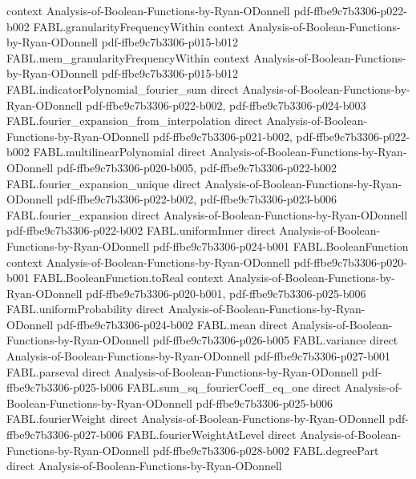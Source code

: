 \begin{theorem}
  {context}
  {Analysis-of-Boolean-Functions-by-Ryan-ODonnell}
  {pdf-ffbe9c7b3306-p022-b002}
\proofstep
  {FABL.granularityFrequencyWithin}
  {context}
  {Analysis-of-Boolean-Functions-by-Ryan-ODonnell}
  {pdf-ffbe9c7b3306-p015-b012}
\proofstep
  {FABL.mem_granularityFrequencyWithin}
  {context}
  {Analysis-of-Boolean-Functions-by-Ryan-ODonnell}
  {pdf-ffbe9c7b3306-p015-b012}
\proofstep
  {FABL.indicatorPolynomial_fourier_sum}
  {direct}
  {Analysis-of-Boolean-Functions-by-Ryan-ODonnell}
  {pdf-ffbe9c7b3306-p022-b002,
    pdf-ffbe9c7b3306-p024-b003}
\proofstep
  {FABL.fourier_expansion_from_interpolation}
  {direct}
  {Analysis-of-Boolean-Functions-by-Ryan-ODonnell}
  {pdf-ffbe9c7b3306-p021-b002,
    pdf-ffbe9c7b3306-p022-b002}
\proofstep
  {FABL.multilinearPolynomial}
  {direct}
  {Analysis-of-Boolean-Functions-by-Ryan-ODonnell}
  {pdf-ffbe9c7b3306-p020-b005,
    pdf-ffbe9c7b3306-p022-b002}
\proofstep
  {FABL.fourier_expansion_unique}
  {direct}
  {Analysis-of-Boolean-Functions-by-Ryan-ODonnell}
  {pdf-ffbe9c7b3306-p022-b002,
    pdf-ffbe9c7b3306-p023-b006}
\proofstep
  {FABL.fourier_expansion}
  {direct}
  {Analysis-of-Boolean-Functions-by-Ryan-ODonnell}
  {pdf-ffbe9c7b3306-p022-b002}
\proofstep
  {FABL.uniformInner}
  {direct}
  {Analysis-of-Boolean-Functions-by-Ryan-ODonnell}
  {pdf-ffbe9c7b3306-p024-b001}
\proofstep
  {FABL.BooleanFunction}
  {context}
  {Analysis-of-Boolean-Functions-by-Ryan-ODonnell}
  {pdf-ffbe9c7b3306-p020-b001}
\proofstep
  {FABL.BooleanFunction.toReal}
  {context}
  {Analysis-of-Boolean-Functions-by-Ryan-ODonnell}
  {pdf-ffbe9c7b3306-p020-b001,
    pdf-ffbe9c7b3306-p025-b006}
\proofstep
  {FABL.uniformProbability}
  {direct}
  {Analysis-of-Boolean-Functions-by-Ryan-ODonnell}
  {pdf-ffbe9c7b3306-p024-b002}
\proofstep
  {FABL.mean}
  {direct}
  {Analysis-of-Boolean-Functions-by-Ryan-ODonnell}
  {pdf-ffbe9c7b3306-p026-b005}
\proofstep
  {FABL.variance}
  {direct}
  {Analysis-of-Boolean-Functions-by-Ryan-ODonnell}
  {pdf-ffbe9c7b3306-p027-b001}
\proofstep
  {FABL.parseval}
  {direct}
  {Analysis-of-Boolean-Functions-by-Ryan-ODonnell}
  {pdf-ffbe9c7b3306-p025-b006}
\proofstep
  {FABL.sum_sq_fourierCoeff_eq_one}
  {direct}
  {Analysis-of-Boolean-Functions-by-Ryan-ODonnell}
  {pdf-ffbe9c7b3306-p025-b006}
\proofstep
  {FABL.fourierWeight}
  {direct}
  {Analysis-of-Boolean-Functions-by-Ryan-ODonnell}
  {pdf-ffbe9c7b3306-p027-b006}
\proofstep
  {FABL.fourierWeightAtLevel}
  {direct}
  {Analysis-of-Boolean-Functions-by-Ryan-ODonnell}
  {pdf-ffbe9c7b3306-p028-b002}
\proofstep
  {FABL.degreePart}
  {direct}
  {Analysis-of-Boolean-Functions-by-Ryan-ODonnell}

\end{theorem}
